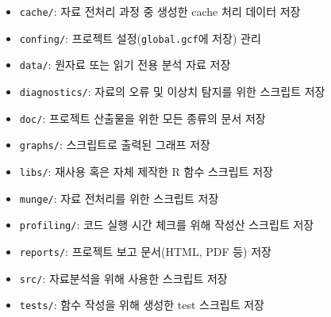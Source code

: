 \documentclass[12pt,a4paper]{book}
\providecommand{\tightlist}{%
  \setlength{\itemsep}{0pt}\setlength{\parskip}{0pt}}
\theoremstyle{definition}
\theoremstyle{definition}
\theoremstyle{definition}
\theoremstyle{remark}
\begin{document}
\begin{enumerate}
  \begin{itemize}
  \tightlist
  \item
    \texttt{cache/}: 자료 전처리 과정 중 생성한 cache 처리 데이터 저장
  \item
    \texttt{confing/}: 프로젝트 설정(\texttt{global.gcf}에 저장) 관리
  \item
    \texttt{data/}: 원자료 또는 읽기 전용 분석 자료 저장
  \item
    \texttt{diagnostics/}: 자료의 오류 및 이상치 탐지를 위한 스크립트
    저장
  \item
    \texttt{doc/}: 프로젝트 산출물을 위한 모든 종류의 문서 저장
  \item
    \texttt{graphs/}: 스크립트로 출력된 그래프 저장
  \item
    \texttt{libs/}: 재사용 혹은 자체 제작한 R 함수 스크립트 저장
  \item
    \texttt{munge/}: 자료 전처리를 위한 스크립트 저장
  \item
    \texttt{profiling/}: 코드 실행 시간 체크를 위해 작성산 스크립트 저장
  \item
    \texttt{reports/}: 프로젝트 보고 문서(HTML, PDF 등) 저장
  \item
    \texttt{src/}: 자료분석을 위해 사용한 스크립트 저장
  \item
    \texttt{tests/}: 함수 작성을 위해 생성한 test 스크립트 저장
  \end{itemize}
\end{enumerate}
\end{document}
